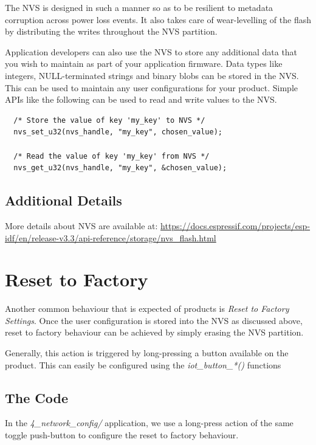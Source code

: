 \documentclass[main.tex]{subfiles}
\begin{document}
The NVS is designed in such a manner so as to be resilient to metadata corruption across power loss events. It also takes care of wear-levelling of the flash by distributing the writes throughout the NVS partition.

Application developers can also use the NVS to store any additional data that you wish to maintain as part of your application firmware. Data types like integers, NULL-terminated strings and binary blobs can be stored in the NVS. This can be used to maintain any user configurations for your product. Simple APIs like the following can be used to read and write values to the NVS.

\begin{verbatim}
  /* Store the value of key 'my_key' to NVS */
  nvs_set_u32(nvs_handle, "my_key", chosen_value);

  /* Read the value of key 'my_key' from NVS */
  nvs_get_u32(nvs_handle, "my_key", &chosen_value);
\end{verbatim}


\subsection{Additional Details}

More details about NVS are available at: \url{https://docs.espressif.com/projects/esp-idf/en/release-v3.3/api-reference/storage/nvs_flash.html}

\section{Reset to Factory}
Another common behaviour that is expected of products is \textit{Reset to Factory Settings}. Once the user configuration is stored into the NVS as discussed above, reset to factory behaviour can be achieved by simply erasing the NVS partition.

Generally, this action is triggered by long-pressing a button available on the product. This can easily be configured using the \textit{iot\_button\_*()} functions

\subsection{The Code}\label{sec:reset_to_factory}
In the \textit{4\_network\_config/} application, we use a long-press action of the same toggle push-button to configure the reset to factory behaviour.
\end{document}
